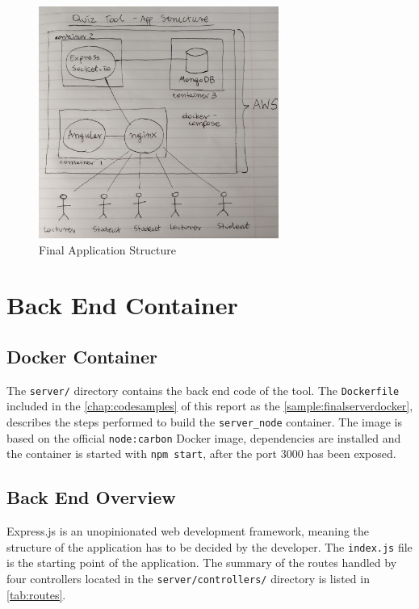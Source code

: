 \begin{figure}[h!]
    \centering
    \includegraphics[width=0.7\textwidth]{../../design/app_structure.jpg}
    \caption{Final Application Structure}
    \label{fig:finalappstrucure}
\end{figure}

\section{Back End Container}
\subsection{Docker Container}
The \texttt{server/} directory contains the back end code of the tool. The \texttt{Dockerfile}
included in the \autoref{chap:codesamples} of this report as the \autoref{sample:finalserverdocker},
describes the steps performed to build the \texttt{server\_node} container. The image is
based on the official \texttt{node:carbon} Docker image, dependencies are installed and
the container is started with \texttt{npm start}, after the port 3000 has been exposed.

\subsection{Back End Overview}
Express.js is an unopinionated web development framework, meaning the structure of the application
has to be decided by the developer. The \texttt{index.js} file is the starting point of the
application. The summary of the routes handled by four controllers located in the \texttt{server/controllers/}
directory is listed in \autoref{tab:routes}.

